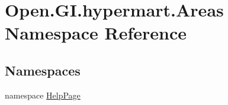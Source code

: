 \hypertarget{namespace_open_1_1_g_i_1_1hypermart_1_1_areas}{}\section{Open.\+G\+I.\+hypermart.\+Areas Namespace Reference}
\label{namespace_open_1_1_g_i_1_1hypermart_1_1_areas}
\subsection*{Namespaces}
\begin{DoxyCompactItemize}
\item 
namespace \hyperlink{namespace_open_1_1_g_i_1_1hypermart_1_1_areas_1_1_help_page}{Help\+Page}
\end{DoxyCompactItemize}
